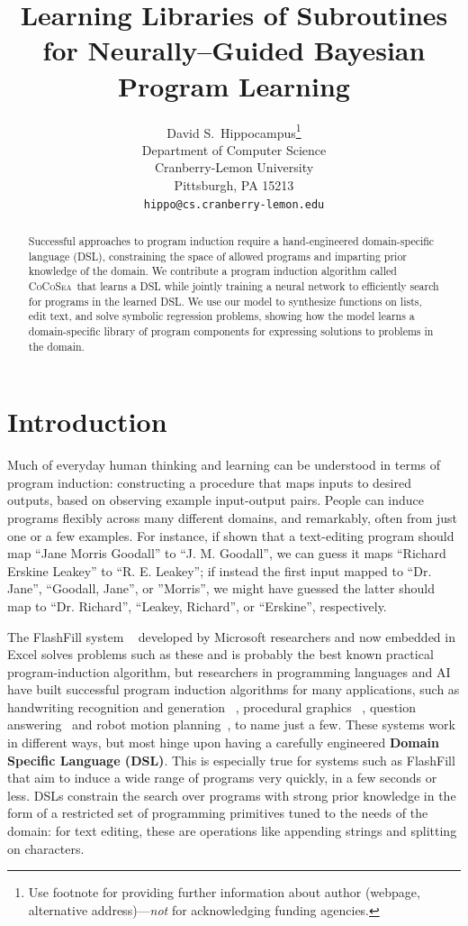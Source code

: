 \documentclass{article}
\title{Learning Libraries of Subroutines for Neurally--Guided Bayesian Program Learning}
\author{
  David S.~Hippocampus\thanks{Use footnote for providing further
    information about author (webpage, alternative
    address)---\emph{not} for acknowledging funding agencies.} \\
  Department of Computer Science\\
  Cranberry-Lemon University\\
  Pittsburgh, PA 15213 \\
  \texttt{hippo@cs.cranberry-lemon.edu} \\
}
\newcommand{\system}{\textsc{CoCoSea}~}
\begin{document}

\maketitle

\begin{abstract}
  Successful approaches to program induction require a hand-engineered
  domain-specific language (DSL), constraining the space of allowed
  programs and imparting prior knowledge of the domain.  We contribute
  a program induction algorithm called \system that learns a DSL while
  jointly training a neural network to efficiently search for programs
  in the learned DSL.  We use our model to synthesize functions on lists,
  edit text, and solve symbolic regression problems, showing how the
  model learns a domain-specific library of program components for
  expressing solutions to problems in the domain.
\end{abstract}


\section{Introduction}

Much of everyday human thinking and learning can be understood in
terms of program induction: constructing a procedure that maps inputs
to desired outputs, based on observing example input-output pairs.
People can induce programs flexibly across many different domains, and
remarkably, often from just one or a few examples.  For instance, if
shown that a text-editing program should map ``Jane Morris Goodall''
to ``J. M. Goodall'', we can guess it maps ``Richard Erskine Leakey''
to ``R. E. Leakey''; if instead the first input mapped to
``Dr. Jane'', ``Goodall, Jane'', or ''Morris'', we might have guessed
the latter should map to ``Dr. Richard'', ``Leakey, Richard'', or
``Erskine'', respectively.

The FlashFill system ~\cite{gulwani2011automating} developed by
Microsoft researchers and now embedded in Excel solves problems such
as these and is probably the best known practical program-induction
algorithm, but researchers in programming languages and AI have built
successful program induction algorithms for many applications, 
such as handwriting recognition and generation ~\cite{lake2015human},
procedural graphics ~\cite{ellis2017learning}, question
answering~\cite{johnson2017clevr} and robot motion
planning~\cite{devlin2017neural}, to name just a few.
These systems work in different ways, but most hinge upon having a
carefully engineered \textbf{Domain Specific Language (DSL)}.  This is
especially true for systems such as FlashFill that aim to induce a
wide range of programs very quickly, in a few seconds or less.  DSLs
constrain the search over programs with strong prior knowledge in the
form of a restricted set of programming primitives tuned to the needs
of the domain: for text editing, these are operations like appending
strings and splitting on characters.  
\end{document}
